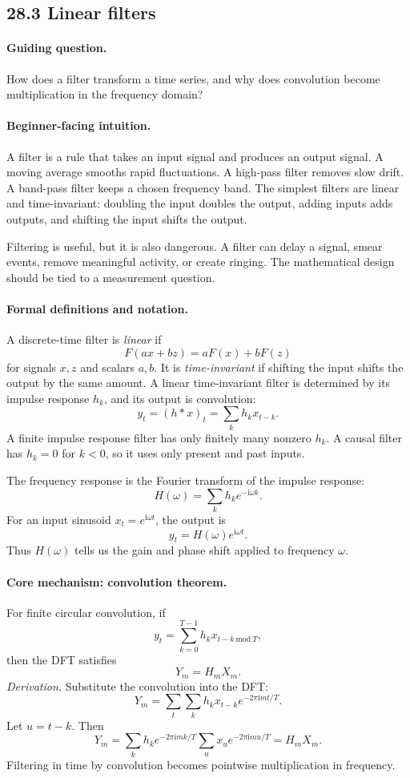 \subsection{28.3 Linear filters}

\paragraph{Guiding question.}
How does a filter transform a time series, and why does convolution become multiplication in the frequency domain?

\paragraph{Beginner-facing intuition.}
A filter is a rule that takes an input signal and produces an output signal. A moving average smooths rapid fluctuations. A high-pass filter removes slow drift. A band-pass filter keeps a chosen frequency band. The simplest filters are linear and time-invariant: doubling the input doubles the output, adding inputs adds outputs, and shifting the input shifts the output.

Filtering is useful, but it is also dangerous. A filter can delay a signal, smear events, remove meaningful activity, or create ringing. The mathematical design should be tied to a measurement question.

\paragraph{Formal definitions and notation.}
A discrete-time filter is \emph{linear} if
\[
F(ax+bz)=aF(x)+bF(z)
\]
for signals \(x,z\) and scalars \(a,b\). It is \emph{time-invariant} if shifting the input shifts the output by the same amount. A linear time-invariant filter is determined by its impulse response \(h_k\), and its output is convolution:
\[
\boxed{y_t=(h*x)_t=\sum_k h_k x_{t-k}.}
\]
A finite impulse response filter has only finitely many nonzero \(h_k\). A causal filter has \(h_k=0\) for \(k<0\), so it uses only present and past inputs.

The frequency response is the Fourier transform of the impulse response:
\[
H(\omega)=\sum_k h_k e^{-\mathrm{i}\omega k}.
\]
For an input sinusoid \(x_t=e^{\mathrm{i}\omega t}\), the output is
\[
y_t=H(\omega)e^{\mathrm{i}\omega t}.
\]
Thus \(H(\omega)\) tells us the gain and phase shift applied to frequency \(\omega\).

\paragraph{Core mechanism: convolution theorem.}
For finite circular convolution, if
\[
y_t=\sum_{k=0}^{T-1}h_k x_{t-k \ \mathrm{mod}\ T},
\]
then the DFT satisfies
\[
\boxed{Y_m=H_mX_m.}
\]
\emph{Derivation.} Substitute the convolution into the DFT:
\[
Y_m=\sum_t\sum_k h_k x_{t-k}e^{-2\pi\mathrm{i}mt/T}.
\]
Let \(u=t-k\). Then
\[
Y_m=\sum_k h_ke^{-2\pi\mathrm{i}mk/T}\sum_u x_u e^{-2\pi\mathrm{i}mu/T}
=H_mX_m.
\]
Filtering in time by convolution becomes pointwise multiplication in frequency.

